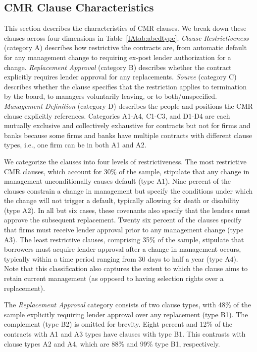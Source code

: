 \documentclass[12pt]{article}
\begin{document}
\begin{appendices}
\section{CMR Clause Characteristics}
\label{IApp:cmr_characteristics}

This section describes the characteristics of CMR clauses.
We break down these clauses across four dimensions in Table~\ref{IAtab:abcdtype}.
\textit{Clause Restrictiveness} (category A) describes how restrictive the contracts are, from automatic default for any management change to requiring ex-post lender authorization for a change.
\textit{Replacement Approval} (category B) describes whether the contract explicitly requires lender approval for any replacements.
\textit{Source} (category C) describes whether the clause specifies that the restriction applies to termination by the board, to managers voluntarily leaving, or to both/unspecified.
\textit{Management Definition} (category D) describes the people and positions the CMR clause explicitly references.
Categories A1-A4, C1-C3, and D1-D4 are each mutually exclusive and collectively exhaustive for contracts but not for firms and banks because some firms and banks have multiple contracts with different clause types, i.e., one firm can be in both A1 and A2.


We categorize the clauses into four levels of restrictiveness.
The most restrictive CMR clauses, which account for 30\% of the sample, stipulate that any change in management unconditionally causes default (type A1).
Nine percent of the clauses constrain a change in management but specify the conditions under which the change will not trigger a default, typically allowing for death or disability (type A2).
In all but six cases, these covenants also specify that the lenders must approve the subsequent replacement.
Twenty six percent of the clauses specify that firms must receive lender approval prior to any management change (type A3).
The least restrictive clauses, comprising 35\% of the sample, stipulate that borrowers must acquire lender approval after a change in management occurs, typically within a time period ranging from 30 days to half a year (type A4).
Note that this classification also captures the extent to which the clause aims to retain current management (as opposed to having selection rights over a replacement).


The \textit{Replacement Approval} category consists of two clause types, with 48\% of the sample explicitly requiring lender approval over any replacement (type B1).
The complement (type B2) is omitted for brevity.
Eight percent and 12\% of the contracts with A1 and A3 types have clauses with type B1.
This contrasts with clause types A2 and A4, which are 88\% and 99\% type B1, respectively.


\end{appendices}
\end{document}
